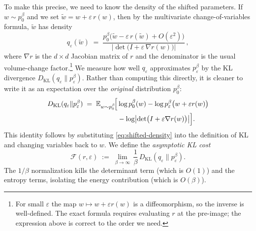 \documentclass[11pt]{article}
\newcommand{\E}{\mathbb{E}}
\begin{document}
To make this precise, we need to know the density of the shifted parameters. If $w\sim p_0^\beta$ and we set $\tilde w = w + \varepsilon\,r(w)$, then by the multivariate change-of-variables formula, $\tilde w$ has density
\begin{equation}\label{eq:shifted-density}
  q_\varepsilon(\tilde w) \;=\; \frac{p_0^\beta\bigl(\tilde w - \varepsilon\,r(\tilde w) + O(\varepsilon^2)\bigr)}{\bigl|\det\bigl(I + \varepsilon\,\nabla r(w)\bigr)\bigr|}\,,
\end{equation}
where $\nabla r$ is the $d\times d$ Jacobian matrix of $r$ and the denominator is the usual volume-change factor.\footnote{For small $\varepsilon$ the map $w\mapsto w+\varepsilon r(w)$ is a diffeomorphism, so the inverse is well-defined. The exact formula requires evaluating $r$ at the pre-image; the expression above is correct to the order we need.} We measure how well $q_\varepsilon$ approximates $p_\varepsilon^\beta$ by the KL divergence $D_{\mathrm{KL}}(q_\varepsilon\|p_\varepsilon^\beta)$. Rather than computing this directly, it is cleaner to write it as an expectation over the \emph{original} distribution $p_0^\beta$:
\begin{equation}\label{eq:kl-expectation}
  \begin{aligned}
    D_{\mathrm{KL}}(q_\varepsilon\|p_\varepsilon^\beta) \;=\; \E_{w\sim p_0^\beta}\!\Bigl[&\log p_0^\beta(w) - \log p_\varepsilon^\beta\bigl(w + \varepsilon r(w)\bigr) \\
    &- \log\bigl|\det\bigl(I + \varepsilon\nabla r(w)\bigr)\bigr|\Bigr].
  \end{aligned}
\end{equation}
This identity follows by substituting \eqref{eq:shifted-density} into the definition of KL and changing variables back to $w$. We define the \emph{asymptotic KL cost}
\begin{equation}\label{eq:ot-cost}
  \mathcal{F}(r,\varepsilon) \;:=\; \lim_{\beta\to\infty}\,\frac{1}{\beta}\,D_{\mathrm{KL}}(q_\varepsilon\|p_\varepsilon^\beta).
\end{equation}
The $1/\beta$ normalization kills the determinant term (which is $O(1)$) and the entropy terms, isolating the energy contribution (which is $O(\beta)$).
\end{document}
